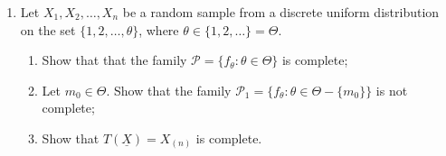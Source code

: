 \documentclass[11pt]{article}
\begin{document}
\begin{enumerate}
    \item [7.] Let $X_1, X_2, \dots, X_n$ be a random sample from a discrete uniform distribution on the set $\{1, 2, \dots, \theta\}$, where $\theta \in \{1, 2, \dots\} = \Theta$.
    \begin{enumerate}
        \item[(a] Show that that the family $\mathcal{P} = \{f_\theta : \theta \in \Theta\}$ is complete;
        \item[(b)] Let $m_0 \in \Theta$. Show that the family $\mathcal{P}_1 = \{f_\theta : \theta \in \Theta - \{m_0\}\}$ is not complete;
        \item[(c)] Show that $T(\underline{X}) = X_{(n)}$ is complete.
    \end{enumerate}
\end{enumerate}
\end{document}
